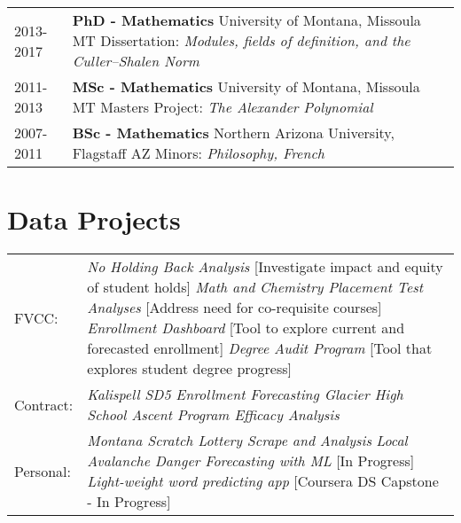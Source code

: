 \documentclass[12pt]{article}
\begin{document}
\begin{tabular}{ l p{15in} }
    2013-2017 & \textbf{PhD - Mathematics} 
    \newline University of Montana, Missoula MT
    \newline Dissertation: \textit{Modules, fields of definition, and the Culler--Shalen Norm} \\ 

        2011-2013 & \textbf{MSc - Mathematics} 
    \newline University of Montana, Missoula MT
    \newline Masters Project: \textit{The Alexander Polynomial}\\  
    
        2007-2011 & \textbf{BSc - Mathematics} 
    \newline Northern Arizona University, Flagstaff AZ
    \newline Minors: \textit{Philosophy, French} \\ 
\end{tabular}

\section{Data Projects}
\begin{tabular}{ l p{15in} }

FVCC: & \textit{No Holding Back Analysis} [Investigate impact and equity of student holds] 
			\newline \textit{Math and Chemistry Placement Test Analyses} [Address need for co-requisite courses]
			\newline \textit{Enrollment Dashboard} [Tool to explore current and forecasted enrollment]
			\newline \textit{Degree Audit Program} [Tool that explores student degree progress] \\

Contract: & \textit{Kalispell SD5 Enrollment Forecasting 
			\newline Glacier High School Ascent Program Efficacy Analysis} \\

Personal: & \textit{Montana Scratch Lottery Scrape and Analysis}
		\newline \textit{Local Avalanche Danger Forecasting with ML} [In Progress] 
		\newline \textit{Light-weight word predicting app} [Coursera DS Capstone - In Progress] \\
\end{tabular}
\end{document}
